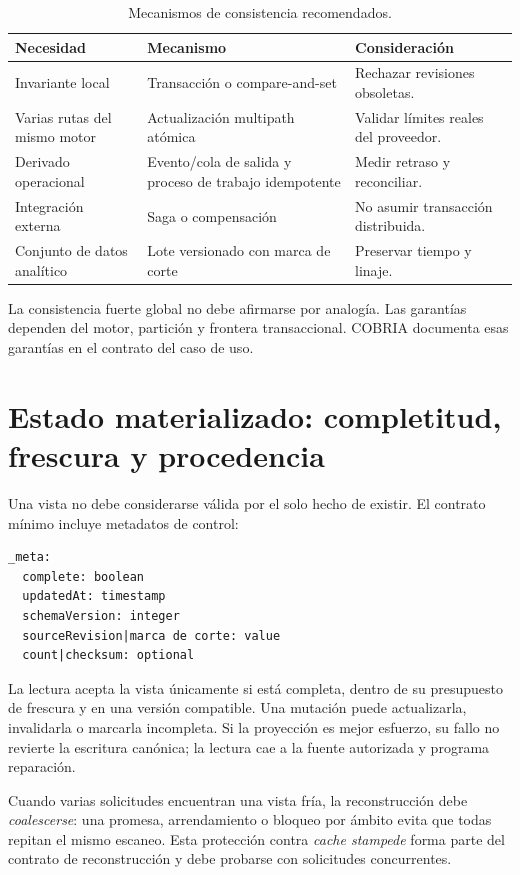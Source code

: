\begin{table}[H]
\centering
\caption{Mecanismos de consistencia recomendados.}
\label{tab:consistencia-mecanismos}
\begin{tabularx}{\textwidth}{p{3cm}p{4cm}X}
\toprule
Necesidad & Mecanismo & Consideración \\
\midrule
Invariante local & Transacción o compare-and-set & Rechazar revisiones obsoletas.\\
Varias rutas del mismo motor & Actualización multipath atómica & Validar límites reales
del proveedor.\\
Derivado operacional & Evento/cola de salida y proceso de trabajo idempotente & Medir retraso y reconciliar.\\
Integración externa & Saga o compensación & No asumir transacción distribuida.\\
Conjunto de datos analítico & Lote versionado con marca de corte & Preservar tiempo y linaje.\\
\bottomrule
\end{tabularx}
\end{table}

La consistencia fuerte global no debe afirmarse por analogía. Las garantías dependen del
motor, partición y frontera transaccional. COBRIA documenta esas garantías en el contrato
del caso de uso.

\section{Estado materializado: completitud, frescura y procedencia}

Una vista no debe considerarse válida por el solo hecho de existir. El contrato mínimo
incluye metadatos de control:

\begin{verbatim}
_meta:
  complete: boolean
  updatedAt: timestamp
  schemaVersion: integer
  sourceRevision|marca de corte: value
  count|checksum: optional
\end{verbatim}

La lectura acepta la vista únicamente si está completa, dentro de su presupuesto de
frescura y en una versión compatible. Una mutación puede actualizarla, invalidarla o
marcarla incompleta. Si la proyección es mejor esfuerzo, su fallo no revierte la escritura
canónica; la lectura cae a la fuente autorizada y programa reparación.

Cuando varias solicitudes encuentran una vista fría, la reconstrucción debe
\emph{coalescerse}: una promesa, arrendamiento o bloqueo por ámbito evita que todas repitan el mismo
escaneo. Esta protección contra \emph{cache stampede} forma parte del contrato de
reconstrucción y debe probarse con solicitudes concurrentes.

